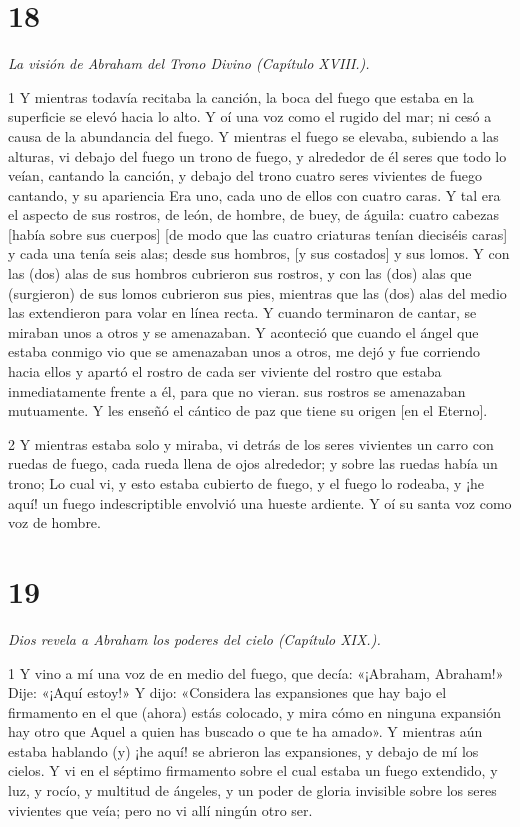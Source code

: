 \chapter{18}

\par \textit{La visión de Abraham del Trono Divino (Capítulo XVIII.).}

\par 1 Y mientras todavía recitaba la canción, la boca del fuego que estaba en la superficie se elevó hacia lo alto. Y oí una voz como el rugido del mar; ni cesó a causa de la abundancia del fuego. Y mientras el fuego se elevaba, subiendo a las alturas, vi debajo del fuego un trono de fuego, y alrededor de él seres que todo lo veían, cantando la canción, y debajo del trono cuatro seres vivientes de fuego cantando, y su apariencia Era uno, cada uno de ellos con cuatro caras. Y tal era el aspecto de sus rostros, de león, de hombre, de buey, de águila: cuatro cabezas [había sobre sus cuerpos] [de modo que las cuatro criaturas tenían dieciséis caras] y cada una tenía seis alas; desde sus hombros, [y sus costados] y sus lomos. Y con las (dos) alas de sus hombros cubrieron sus rostros, y con las (dos) alas que (surgieron) de sus lomos cubrieron sus pies, mientras que las (dos) alas del medio las extendieron para volar en línea recta. Y cuando terminaron de cantar, se miraban unos a otros y se amenazaban. Y aconteció que cuando el ángel que estaba conmigo vio que se amenazaban unos a otros, me dejó y fue corriendo hacia ellos y apartó el rostro de cada ser viviente del rostro que estaba inmediatamente frente a él, para que no vieran. sus rostros se amenazaban mutuamente. Y les enseñó el cántico de paz que tiene su origen [en el Eterno].

\par 2 Y mientras estaba solo y miraba, vi detrás de los seres vivientes un carro con ruedas de fuego, cada rueda llena de ojos alrededor; y sobre las ruedas había un trono; Lo cual vi, y esto estaba cubierto de fuego, y el fuego lo rodeaba, y ¡he aquí! un fuego indescriptible envolvió una hueste ardiente. Y oí su santa voz como voz de hombre.

\chapter{19}

\par \textit{Dios revela a Abraham los poderes del cielo (Capítulo XIX.).}

\par 1 Y vino a mí una voz de en medio del fuego, que decía: «¡Abraham, Abraham!» Dije: «¡Aquí estoy!» Y dijo: «Considera las expansiones que hay bajo el firmamento en el que (ahora) estás colocado, y mira cómo en ninguna expansión hay otro que Aquel a quien has buscado o que te ha amado». Y mientras aún estaba hablando (y) ¡he aquí! se abrieron las expansiones, y debajo de mí los cielos. Y vi en el séptimo firmamento sobre el cual estaba un fuego extendido, y luz, y rocío, y multitud de ángeles, y un poder de gloria invisible sobre los seres vivientes que veía; pero no vi allí ningún otro ser.

